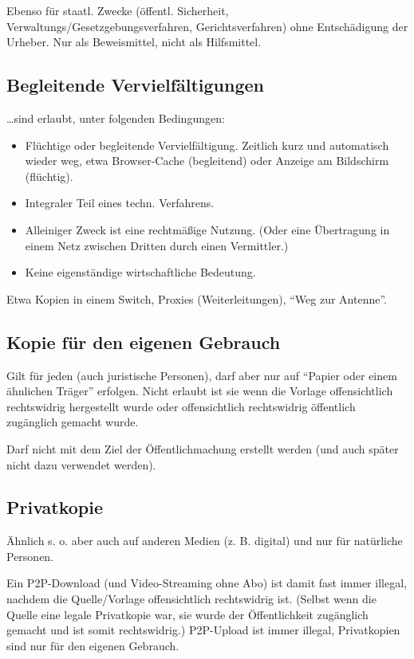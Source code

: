\documentclass[twocolumn]{article}
\begin{document}
Ebenso für staatl. Zwecke (öffentl. Sicherheit, Verwaltungs/Gesetzgebungsverfahren, Gerichtsverfahren) ohne Entschädigung der Urheber. Nur als Beweismittel, nicht als Hilfsmittel.

\subsection{Begleitende Vervielfältigungen}

\ldots sind erlaubt, unter folgenden Bedingungen:
\begin{itemize}
    \item Flüchtige oder begleitende Vervielfältigung. Zeitlich kurz und automatisch wieder weg, etwa Browser-Cache (begleitend) oder Anzeige am Bildschirm (flüchtig).
    \item Integraler Teil eines techn. Verfahrens.
    \item Alleiniger Zweck ist eine rechtmäßige Nutzung. (Oder eine Übertragung in einem Netz zwischen Dritten durch einen Vermittler.)
    \item Keine eigenständige wirtschaftliche Bedeutung.
\end{itemize}
Etwa Kopien in einem Switch, Proxies (Weiterleitungen), \enquote{Weg zur Antenne}.

\subsection{Kopie für den eigenen Gebrauch}

Gilt für jeden (auch juristische Personen), darf aber nur auf \enquote{Papier oder einem ähnlichen Träger} erfolgen. Nicht erlaubt ist sie wenn die Vorlage offensichtlich rechtswidrig hergestellt wurde oder offensichtlich rechtswidrig öffentlich zugänglich gemacht wurde.

Darf nicht mit dem Ziel der Öffentlichmachung erstellt werden (und auch später nicht dazu verwendet werden).

\subsection{Privatkopie}

Ähnlich s. o. aber auch auf anderen Medien (z. B. digital) und nur für natürliche Personen.

Ein P2P-Download (und Video-Streaming ohne Abo) ist damit fast immer illegal, nachdem die Quelle/Vorlage offensichtlich rechtswidrig ist. (Selbst wenn die Quelle eine legale Privatkopie war, sie wurde der Öffentlichkeit zugänglich gemacht und ist somit rechtswidrig.) P2P-Upload ist immer illegal, Privatkopien sind nur für den eigenen Gebrauch.
\end{document}
